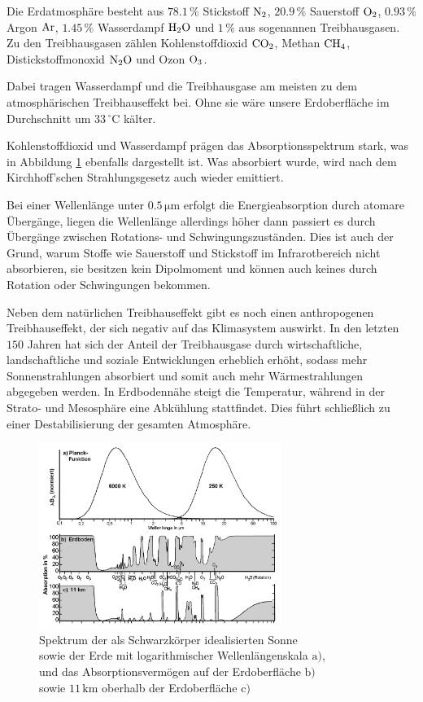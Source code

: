 \documentclass[12pt,a4paper]{scrartcl}
\numberwithin{equation}{section} %
\begin{document}
Die Erdatmosphäre besteht aus $78.1\,\%$ Stickstoff $\ce{N_2}$, $20.9\,\%$ Sauerstoff $\ce{O_2}$, $0.93\,\%$ Argon $\ce{Ar}$, $1.45\,\%$ Wasserdampf $\ce{H_2O}$ und $1\,\%$ aus sogenannen Treibhausgasen. Zu den Treibhausgasen zählen Kohlenstoffdioxid $\ce{CO_2}$, Methan $\ce{CH_4}$, Distickstoffmonoxid $\ce{N_2O}$ und Ozon $\ce{O_3}$.

Dabei tragen Wasserdampf und die Treibhausgase am meisten zu dem atmosphärischen Treibhauseffekt bei. Ohne sie wäre unsere Erdoberfläche im Durchschnitt um $33\mathrm{\,^\circ C}$ kälter. \cite{BakanRaschke}

Kohlenstoffdioxid und Wasserdampf prägen das Absorptionsspektrum stark, was in Abbildung \ref{abb:Spektrum Sonne & Erde} ebenfalls dargestellt ist. Was absorbiert wurde, wird nach dem Kirchhoff'schen Strahlungsgesetz auch wieder emittiert.

Bei einer Wellenlänge unter $0.5\mathrm{\,\mu m}$ erfolgt die Energieabsorption durch atomare Übergänge, liegen die Wellenlänge allerdings höher dann passiert es durch Übergänge zwischen Rotations- und Schwingungszuständen. Dies ist auch der Grund, warum Stoffe wie Sauerstoff und Stickstoff im Infrarotbereich nicht absorbieren, sie besitzen kein Dipolmoment und können auch keines durch Rotation oder Schwingungen bekommen. \cite{BakanRaschke}

Neben dem natürlichen Treibhauseffekt gibt es noch einen anthropogenen Treibhauseffekt, der sich negativ auf das Klimasystem auswirkt. In den letzten $150$ Jahren hat sich der Anteil der Treibhausgase durch wirtschaftliche, landschaftliche und soziale Entwicklungen erheblich erhöht, sodass mehr Sonnenstrahlungen absorbiert und somit auch mehr Wärmestrahlungen abgegeben werden. In Erdbodennähe steigt die Temperatur, während in der Strato- und Mesosphäre eine Abkühlung stattfindet. Dies führt schließlich zu einer Destabilisierung der gesamten Atmosphäre. \cite{BakanRaschke}

\begin{figure}[h!]
	\centering
	\includegraphics[width=0.7\textwidth]{../media/B1.1/Spektrum_Sonne_Erde.png}
	\caption{Spektrum der als Schwarzkörper idealisierten Sonne\\
		sowie der Erde mit logarithmischer Wellenlängenskala $\mathrm a)$,\\
		und das Absorptionsvermögen auf der Erdoberfläche $\mathrm b)$\\
		sowie $11\mathrm{\,km}$ oberhalb der Erdoberfläche $\mathrm c)$ \cite{GoodyYung}}
	\label{abb:Spektrum Sonne & Erde}
\end{figure}
\end{document}
